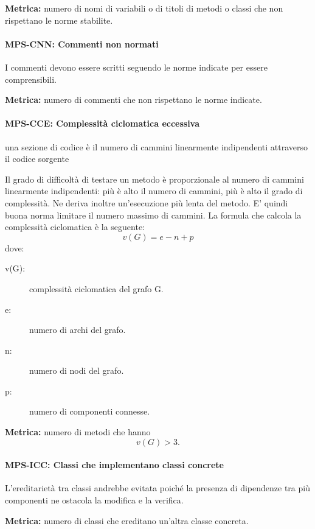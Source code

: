\documentclass[../../norme-di-progetto.tex]{subfiles}
\begin{document}
\textbf{Metrica:} numero di nomi di variabili o di titoli di metodi o classi che non rispettano le norme stabilite.

\paragraph{MPS-CNN: Commenti non normati}%
\label{par:MPS-CNN_commenti_non_normati}

I commenti devono essere scritti seguendo le norme indicate per essere comprensibili.

\textbf{Metrica:} numero di commenti che non rispettano le norme indicate.

\paragraph{MPS-CCE: Complessità ciclomatica eccessiva}%
\label{par:MPS-CCE_complessita_ciclomatica_eccessiva}
una sezione di codice è il numero di cammini linearmente indipendenti attraverso il codice sorgente

Il grado di difficoltà di testare un metodo è proporzionale al numero di cammini linearmente indipendenti: più è alto il numero di cammini, più è alto il grado di complessità.
Ne deriva inoltre un'esecuzione più lenta del metodo. E' quindi buona norma limitare il numero massimo di cammini.
La formula che calcola la complessità ciclomatica è la seguente:
\[
  v(G) = e - n + p
\]
dove:
\begin{description}
  \item[v(G):] complessità ciclomatica del grafo G. %
  \item[e:] numero di archi del grafo.
  \item[n:] numero di nodi del grafo.
  \item[p:] numero di componenti connesse.
\end{description}
\textbf{Metrica:} numero di metodi che hanno \[v(G) > 3.\]

\paragraph{MPS-ICC: Classi che implementano classi concrete}%
\label{par:MPS-ICC_classi_implementano_concrete}
L'ereditarietà tra classi andrebbe evitata poiché la presenza di dipendenze tra più componenti ne ostacola la modifica e la verifica.

\textbf{Metrica:} numero di classi che ereditano un'altra classe concreta.


\end{document}
